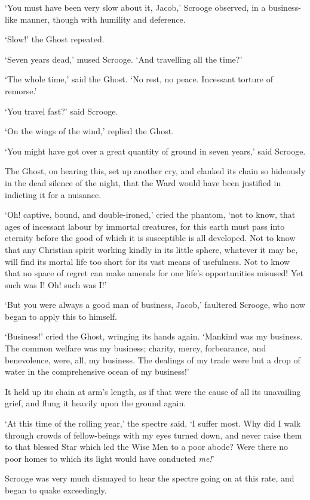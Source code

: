 \documentclass[11pt,twoside]{article}\makeatletter
\begin{document}
‘You must have been very slow about it, Jacob,’ Scrooge observed, in a business-like manner, though with humility and deference. \par
‘Slow!’ the Ghost repeated.\par
‘Seven years dead,’ mused Scrooge. ‘And travelling all the time?’\par
‘The whole time,’ said the Ghost. ‘No rest, no peace. Incessant torture of remorse.’\par
‘You travel fast?’ said Scrooge.\par
‘On the wings of the wind,’ replied the Ghost.\par
‘You might have got over a great quantity of ground in seven years,’ said Scrooge.\par
The Ghost, on hearing this, set up another cry, and clanked its chain so hideously in the dead silence of the night, that the Ward would have been justified in indicting it for a nuisance. \par
‘Oh! captive, bound, and double-ironed,’ cried the phantom, ‘not to know, that ages of incessant labour by immortal creatures, for this earth must pass into eternity before the good of which it is susceptible is all developed. Not to know that any Christian spirit working kindly in its little sphere, whatever it may be, will find its mortal life too short for its vast means of usefulness. Not to know that no space of regret can make amends for one life's opportunities misused! Yet such was I! Oh! such was I!’\par
‘But you were always a good man of business, Jacob,’ faultered Scrooge, who now began to apply this to himself.\par
‘Business!’ cried the Ghost, wringing its hands again. ‘Mankind was my business. The common welfare was my business; charity, mercy, forbearance, and benevolence, were, all, my business. The dealings of my trade were but a drop of water in the comprehensive ocean of my business!’\par
It held up its chain at arm's length, as if that were the cause of all its unavailing grief, and flung it heavily upon the ground again. \par
‘At this time of the rolling year,’ the spectre said, ‘I suffer most. Why did I walk through crowds of fellow-beings with my eyes turned down, and never raise them to that blessed Star which led the Wise Men to a poor abode? Were there no poor homes to which its light would have conducted \textit{me!}’\par
Scrooge was very much dismayed to hear the spectre going on at this rate, and began to quake exceedingly. \par
\end{document}
